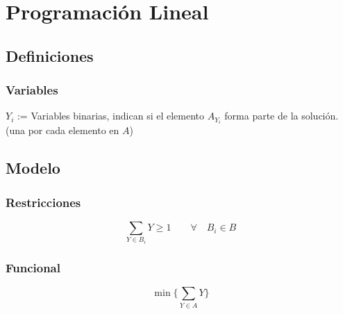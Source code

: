 \section{Programaci\'on Lineal}

\subsection{Definiciones}

\subsubsection{Variables}

\begin{center}
    $Y_i$ := Variables binarias, indican si el elemento $A_{Y_i}$ forma parte
    de la soluci\'on. \\ (una por cada elemento en $A$)
\end{center}

\subsection{Modelo}

\subsubsection{Restricciones}

\begin{equation}
    \sum_{Y \in B_i} Y \ge 1 \qquad \forall \quad B_i \in B
\end{equation}

\subsubsection{Funcional}

\begin{equation}
    \min \{ \sum_{Y \in A} Y \}
\end{equation}


